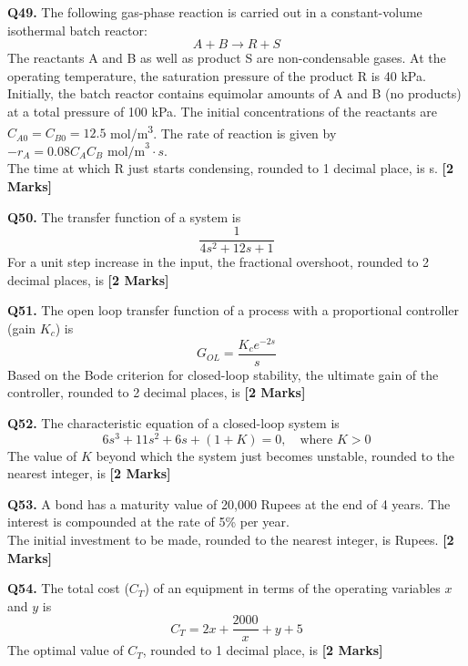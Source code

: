 \documentclass[11pt]{article}
\newcommand{\questionb}[2]{
    \noindent\textbf{Q#2.} #1 \hfill \textbf{[2 Marks]}
}
\begin{document}
\questionb{The following gas-phase reaction is carried out in a constant-volume isothermal batch reactor:  
\[
A + B \rightarrow R + S
\]  
The reactants A and B as well as product S are non-condensable gases. At the operating temperature, the saturation pressure of the product R is 40 kPa.  
\\ Initially, the batch reactor contains equimolar amounts of A and B (no products) at a total pressure of 100 kPa. The initial concentrations of the reactants are \( C_{A0} = C_{B0} = 12.5 \) mol/m\textsuperscript{3}. The rate of reaction is given by \( -r_A = 0.08 C_A C_B \text{ mol/m}^3\cdot s \).  
\\ The time at which R just starts condensing, rounded to 1 decimal place, is s.}{49}
\vspace{0.5cm}

\questionb{The transfer function of a system is  
\[
\frac{1}{4s^2 + 12s + 1}
\]  
For a unit step increase in the input, the fractional overshoot, rounded to 2 decimal places, is}{50}
\vspace{0.5cm}

\questionb{The open loop transfer function of a process with a proportional controller (gain \( K_c \)) is  
\[
G_{OL} = \frac{K_c e^{-2s}}{s}
\]  
Based on the Bode criterion for closed-loop stability, the ultimate gain of the controller, rounded to 2 decimal places, is}{51}
\vspace{0.5cm}

\questionb{The characteristic equation of a closed-loop system is  
\[
6s^3 + 11s^2 + 6s + (1 + K) = 0, \quad \text{where } K > 0
\]  
The value of \( K \) beyond which the system just becomes unstable, rounded to the nearest integer, is}{52}
\vspace{0.5cm}

\questionb{A bond has a maturity value of 20,000 Rupees at the end of 4 years. The interest is compounded at the rate of 5\% per year.  
\\ The initial investment to be made, rounded to the nearest integer, is Rupees.}{53}
\vspace{0.5cm}

\questionb{The total cost (\( C_T \)) of an equipment in terms of the operating variables \( x \) and \( y \) is  
\[
C_T = 2x + \frac{2000}{x} + y + 5
\]  
The optimal value of \( C_T \), rounded to 1 decimal place, is}{54}
\vspace{0.5cm}
\end{document}
